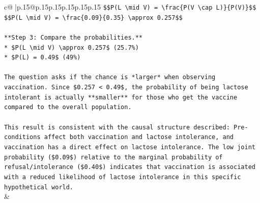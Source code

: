 \documentclass{article}
\begin{document}
{\begin{supertabular}{c@{$\;$}|p{.15\linewidth}@{}p{.15\linewidth}p{.15\linewidth}p{.15\linewidth}p{.15\linewidth}p{.15\linewidth}}
{{{\texttt{\$\$P(L \textbackslash{}mid V) = \textbackslash{}frac\{P(V \textbackslash{}cap L)\}\{P(V)\}\$\$} \\
\texttt{\$\$P(L \textbackslash{}mid V) = \textbackslash{}frac\{0.09\}\{0.35\} \textbackslash{}approx 0.257\$\$} \\
\\ 
\texttt{**Step 3: Compare the probabilities.**} \\
\texttt{*   \$P(L \textbackslash{}mid V) \textbackslash{}approx 0.257\$ (25.7\%)} \\
\texttt{*   \$P(L) = 0.49\$ (49\%)} \\
\\ 
\texttt{The question asks if the chance is *larger* when observing vaccination. Since \$0.257 < 0.49\$, the probability of being lactose intolerant is actually **smaller** for those who get the vaccine compared to the overall population.} \\
\\ 
\texttt{This result is consistent with the causal structure described: Pre{-}conditions affect both vaccination and lactose intolerance, and vaccination has a direct effect on lactose intolerance. The low joint probability (\$0.09\$) relative to the marginal probability of refusal/intolerance (\$0.40\$) indicates that vaccination is associated with a reduced likelihood of lactose intolerance in this specific hypothetical world.} \\
            }
        }
    }
    & \\ \\


\end{supertabular}}
\end{document}
